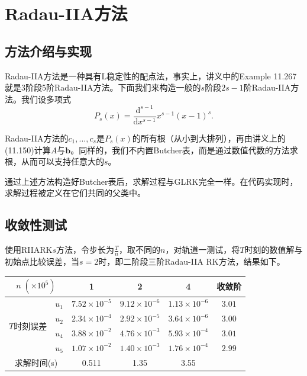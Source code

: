 \documentclass[lang=cn,10pt,bibend=bibtex]{elegantbook}
\begin{document}
\section{Radau-IIA方法}

\subsection{方法介绍与实现}

Radau-IIA方法是一种具有L稳定性的配点法\cite{1969A}，事实上，讲义中的Example 11.267就是3阶段5阶Radau-IIA方法。下面我们来构造一般的$s$阶段$2s-1$阶Radau-IIA方法。我们设多项式
\begin{equation}
  P_s(x)=\frac{\text{d}^{s-1}}{\text{d}x^{s-1}} x^{s-1}(x-1)^s.
\end{equation}

Radau-IIA方法的$c_1,...,c_s$是$P_s(x)$的所有根（从小到大排列），再由讲义上的(11.150)计算$A$与$\mathbf{b}$。同样的，我们不内置Butcher表，而是通过数值代数的方法求根，从而可以支持任意大的$s$。

通过上述方法构造好Butcher表后，求解过程与GLRK完全一样。在代码实现时，求解过程被定义在它们共同的父类中。

\subsection{收敛性测试}

使用RIIARK$s$方法，令步长为$\frac{T}{n}$，取不同的$n$，对轨道一测试，将$T$时刻的数值解与初始点比较误差，当$s=2$时，即二阶段三阶Radau-IIA RK方法，结果如下。

\begin{table}[H]
  \centering
  \renewcommand\arraystretch{0.8}
  \begin{tabular}{cc|ccc|c}
  \multicolumn{2}{c|}{$n\;(\times 10^5)$}                  & 1 & 2 & 4  & 收敛阶 \\ \hline
  \multicolumn{1}{c|}{\multirow{4}{*}{$T$时刻误差}} & \multicolumn{1}{c|}{$u_1$} &  $7.52\times 10^{-5}$  & $9.12\times 10^{-6}$  & $1.13\times 10^{-6}$    &  $3.01$   \\
  \multicolumn{1}{c|}{}                         & \multicolumn{1}{c|}{$u_2$} &  $2.34\times 10^{-4}$     & $2.92\times 10^{-5}$  & $3.64\times 10^{-6}$    &  $3.00$   \\
  \multicolumn{1}{c|}{}                         & \multicolumn{1}{c|}{$u_4$} &  $3.88\times 10^{-2}$     & $4.76\times 10^{-3}$  & $5.93\times 10^{-4}$     &  $3.01$   \\
  \multicolumn{1}{c|}{}                         & \multicolumn{1}{c|}{$u_5$} &  $1.07\times 10^{-2}$     & $1.40\times 10^{-3}$  & $1.76\times 10^{-4}$     &  $2.99$  \\ \hline
  \multicolumn{2}{c|}{求解时间(s)} & 0.511 & 1.35 & 3.55 & 
  \end{tabular}
\end{table}
\end{document}
